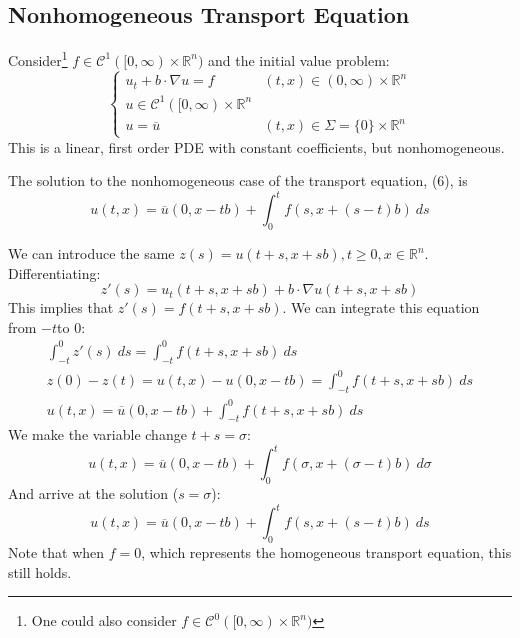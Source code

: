 \documentclass[12pt]{article}
\begin{document}
\subsection{Nonhomogeneous Transport Equation}
\label{sub:linear_non_homogeneous_equations}
Consider\footnote{One could also consider $f\in\mathcal{C}^0([0,\infty)\times\mathbb{R}^n)$} $f\in\mathcal{C}^1([0,\infty)\times\mathbb{R}^{n})$ and the initial value problem:
\begin{equation}
    \begin{cases} 
        u_t+b\cdot\nabla u=f & (t,x)\in(0,\infty)\times\mathbb{R}^{n}\\
        u\in\mathcal{C}^{1}([0,\infty)\times\mathbb{R}^{n}\\
        u=\overline{u} & (t,x)\in\Sigma=\{0\}\times\mathbb{R}^{n}
    \end{cases}
\end{equation}
This is a linear, first order PDE with constant coefficients, but nonhomogeneous. 
\begin{theo}
    The solution to the nonhomogeneous case of the transport equation, (6), is 
\[
    u(t,x)=\overline{u}(0,x-tb)+\int_{0}^{t} f(s,x+(s-t)b)\: ds 
\]
\end{theo}
We can introduce the same $z(s)=u(t+s, x+sb), t\ge 0, x\in\mathbb{R}^n$. Differentiating:
\[
    z'(s)=u_t(t+s,x+sb)+b\cdot\nabla u(t+s,x+sb)
\] 
This implies that $z'(s)=f(t+s,x+sb)$. We can integrate this equation from $-t$to 0:
\begin{gather*}
    \int_{-t}^{0} z'(s)\: ds=\int_{-t}^{0} f(t+s,x+sb)\: ds\\
    z(0)-z(t)=u(t,x)-u(0,x-tb)=\int_{-t}^{0} f(t+s,x+sb)\: ds\\
    u(t,x)=\overline{u}(0,x-tb)+\int_{-t}^{0} f(t+s,x+sb)\: ds
\end{gather*}
We make the variable change $t+s=\sigma$:
\[
    u(t,x)=\overline{u}(0,x-tb)+\int_{0}^{t} f(\sigma,x+(\sigma-t)b)\: d\sigma 
\]
And arrive at the solution ($s=\sigma$):
\begin{equation}
    u(t,x)=\overline{u}(0,x-tb)+\int_{0}^{t} f(s,x+(s-t)b)\: ds 
\end{equation}
Note that when $f=0$, which represents the homogeneous transport equation, this still holds.
\end{document}
